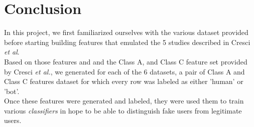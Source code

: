 \documentclass[a4paper,11pt]{article}
\begin{document}
\section{Conclusion}
In this project, we first familiarized ourselves with the various dataset provided before starting building features that emulated the 5 studies described in Cresci \textit{et al}. \\
Based on those features and and the Class A, and Class C feature set provided by Cresci \textit{et al.}, we generated for each of the 6 datasets, a pair of Class A and Class C features dataset for which every row was labeled as either 'human' or 'bot'.\\
Once these features were generated and labeled, they were used them to train various \textit{classifiers} in hope to be able to distinguish fake users from legitimate users.



\end{document}
